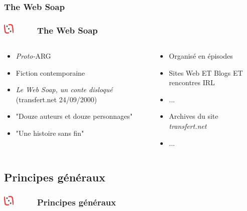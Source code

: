 \documentclass[slidetop,11pt]{beamer}
\def\sectionPartIIaVII{The Web Soap}
\def\sectionPartIIb{Principes g{\'e}n{\'e}raux}
\def\moreInFrameTitleLeftt{\includegraphics[height=0.5cm]{img/ligueludique-0.png}~~~~~}
\begin{document}
\subsubsection{\sectionPartIIaVII}
\begin{frame}
	\frametitle{\moreInFrameTitleLeftt \sectionPartIIaVII }
	\begin{columns}[T]
		\begin{column}[T]{5.00cm}
			\begin{itemize}
				\item \emph{Proto-}ARG
				\item Fiction contemporaine
				\item \emph{Le Web Soap, un conte disloqu{\'e}} (transfert.net 24/09/2000)
				\item "Douze auteurs et douze personnages"
				\item "Une histoire sans fin"
			\end{itemize}
		\end{column}
		\begin{column}[T]{5.00cm}
			\begin{itemize}
				\item Organis{\'e} en {\'e}pisodes
				\item Sites Web ET Blogs ET rencontres IRL
				\item ...
				\item Archives du site \emph{transfert.net}
				\item ...
			\end{itemize}
		\end{column}
	\end{columns}
\end{frame} 


\subsection{\sectionPartIIb} %
\begin{frame}
	\frametitle{\moreInFrameTitleLeftt \sectionPartIIb }
	\tableofcontents[sections=2,currentsection,subsectionstyle=show/shaded/hide]
\end{frame} 
\end{document}
